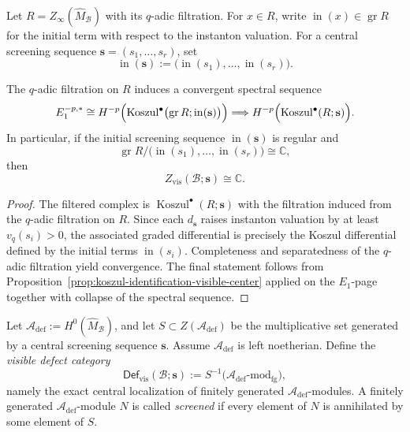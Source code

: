 \begin{definition}
\label{def:initial-screening-system}
Let $R=Z_{\infty}(\widehat M_{\mathcal B})$ with its $q$-adic filtration.
For $x\in R$, write $\operatorname{in}(x)\in \operatorname{gr}R$ for the initial term with respect to the
instanton valuation. For a central screening sequence $\mathbf s=(s_1,\dots,s_r)$, set
\[
\operatorname{in}(\mathbf s):=\bigl(\operatorname{in}(s_1),\dots,\operatorname{in}(s_r)\bigr).
\]
\end{definition}

\begin{theorem}
\label{thm:instanton-screening-spectral-sequence}
The $q$-adic filtration on $R$ induces a convergent spectral sequence
\[
E_1^{-p,*}
\cong
H^{-p}\Bigl(\operatorname{Koszul}^{\bullet}\bigl(\operatorname{gr}R;\operatorname{in}(\mathbf s)\bigr)\Bigr)
\Longrightarrow
H^{-p}\Bigl(\operatorname{Koszul}^{\bullet}(R;\mathbf s)\Bigr).
\]
In particular, if the initial screening sequence $\operatorname{in}(\mathbf s)$ is regular and
\[
\operatorname{gr}R/\bigl(\operatorname{in}(s_1),\dots,\operatorname{in}(s_r)\bigr)\cong \mathbb C,
\]
then
\[
Z_{\mathrm{vis}}(\mathcal B;\mathbf s)\cong \mathbb C.
\]
\end{theorem}

\begin{proof}
The filtered complex is $\operatorname{Koszul}^{\bullet}(R;\mathbf s)$ with the filtration induced from the $q$-adic
filtration on $R$. Since each $d_{\mathbf s}$ raises instanton valuation by at least $v_q(s_i)>0$, the
associated graded differential is precisely the Koszul differential defined by the initial terms
$\operatorname{in}(s_i)$. Completeness and separatedness of the $q$-adic filtration yield convergence.
The final statement follows from Proposition~\ref{prop:koszul-identification-visible-center} applied on the
$E_1$-page together with collapse of the spectral sequence.
\end{proof}

\begin{definition}
\label{def:visible-defect-category}
Let $\mathcal A_{\mathrm{def}}:=H^0(\widehat M_{\mathcal B})$, and let $S\subset Z(\mathcal A_{\mathrm{def}})$ be the
multiplicative set generated by a central screening sequence $\mathbf s$.
Assume $\mathcal A_{\mathrm{def}}$ is left noetherian.
Define the \emph{visible defect category}
\[
\mathsf{Def}_{\mathrm{vis}}(\mathcal B;\mathbf s)
:=S^{-1}\bigl(\mathcal A_{\mathrm{def}}\text{-}\mathrm{mod}_{\mathrm{fg}}\bigr),
\]
namely the exact central localization of finitely generated $\mathcal A_{\mathrm{def}}$-modules.
A finitely generated $\mathcal A_{\mathrm{def}}$-module $N$ is called \emph{screened} if every element of $N$
is annihilated by some element of $S$.
\end{definition}

